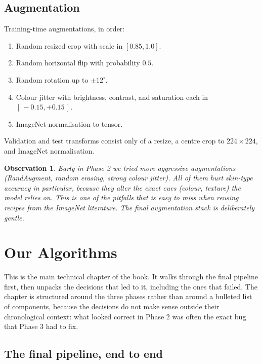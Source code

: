 \documentclass[11pt,a4paper,oneside]{report}
\newtheorem{observation}{Observation}[chapter]
\begin{document}
\section{Augmentation}

Training-time augmentations, in order:

\begin{enumerate}
    \item Random resized crop with scale in \([0.85, 1.0]\).
    \item Random horizontal flip with probability \(0.5\).
    \item Random rotation up to \(\pm 12^\circ\).
    \item Colour jitter with brightness, contrast, and saturation
        each in \([\,{-}0.15, +0.15\,]\).
    \item ImageNet-normalisation to tensor.
\end{enumerate}

Validation and test transforms consist only of a resize, a centre
crop to \(224 \times 224\), and ImageNet normalisation.

\begin{observation}
Early in Phase 2 we tried more aggressive augmentations
(RandAugment, random erasing, strong colour jitter). All of them
hurt skin-type accuracy in particular, because they alter the exact
cues (colour, texture) the model relies on. This is one of the
pitfalls that is easy to miss when reusing recipes from the ImageNet
literature. The final augmentation stack is deliberately gentle.
\end{observation}

\chapter{Our Algorithms}\label{ch:algorithm}

This is the main technical chapter of the book. It walks through the
final pipeline first, then unpacks the decisions that led to it,
including the ones that failed. The chapter is structured around the
three phases rather than around a bulleted list of components,
because the decisions do not make sense outside their chronological
context: what looked correct in Phase 2 was often the exact bug that
Phase 3 had to fix.

\section{The final pipeline, end to end}\label{sec:final-pipeline}
\end{document}
